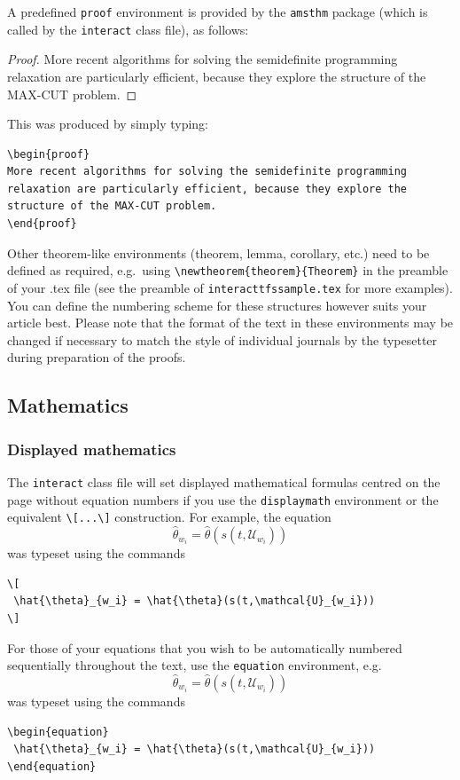 \documentclass[]{interact}
\theoremstyle{plain}%
\theoremstyle{definition}
\theoremstyle{remark}
\begin{document}
A predefined \verb"proof" environment is provided by the \texttt{amsthm} package (which is called by the \texttt{interact} class file), as follows:
\begin{proof}
More recent algorithms for solving the semidefinite programming relaxation are particularly efficient, because they explore the structure of the MAX-CUT problem.
\end{proof}
\noindent This was produced by simply typing:
\begin{verbatim}
\begin{proof}
More recent algorithms for solving the semidefinite programming
relaxation are particularly efficient, because they explore the
structure of the MAX-CUT problem.
\end{proof}
\end{verbatim}
Other theorem-like environments (theorem, lemma, corollary, etc.) need to be defined as required, e.g.\ using \verb"\newtheorem{theorem}{Theorem}" in the preamble of your .tex file (see the preamble of \verb"interacttfssample.tex" for more examples). You can define the numbering scheme for these structures however suits your article best. Please note that the format of the text in these environments may be changed if necessary to match the style of individual journals by the typesetter during preparation of the proofs.


\subsection{Mathematics}

\subsubsection{Displayed mathematics}

The \texttt{interact} class file will set displayed mathematical formulas centred on the page without equation numbers if you use the \texttt{displaymath} environment or the equivalent \verb"\[...\]" construction. For example, the equation
\[
 \hat{\theta}_{w_i} = \hat{\theta}(s(t,\mathcal{U}_{w_i}))
\]
was typeset using the commands
\begin{verbatim}
\[
 \hat{\theta}_{w_i} = \hat{\theta}(s(t,\mathcal{U}_{w_i}))
\]
\end{verbatim}

For those of your equations that you wish to be automatically numbered sequentially throughout the text, use the \texttt{equation} environment, e.g.
\begin{equation}
 \hat{\theta}_{w_i} = \hat{\theta}(s(t,\mathcal{U}_{w_i}))
\end{equation}
was typeset using the commands
\begin{verbatim}
\begin{equation}
 \hat{\theta}_{w_i} = \hat{\theta}(s(t,\mathcal{U}_{w_i}))
\end{equation}
\end{verbatim}
\end{document}
